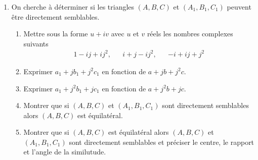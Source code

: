 \begin{enumerate}
\item On cherche à déterminer si les triangles $(A, B, C)$ et $(A_1, B_1, C_1)$ peuvent être directement semblables.
\begin{enumerate}
 \item Mettre sous la forme $u+iv$ avec $u$ et $v$ réels les nombres complexes suivants
\begin{align*}
 1-ij+ij^2, & & i + j -ij^2, & & -i+ij+j^2
\end{align*}
 \item Exprimer $a_1+jb_1+j^2c_1$ en fonction de $a+jb+j^2c$.
 \item Exprimer $a_1+j^2b_1+jc_1$ en fonction de $a+j^2b+jc$.
 \item Montrer que si $(A, B, C)$ et $(A_1, B_1, C_1)$ sont directement semblables alors $(A,B,C)$ est équilatéral.
 \item Montrer que si $(A,B,C)$ est équilatéral alors $(A, B, C)$ et $(A_1, B_1, C_1)$ sont directement semblables et préciser le centre, le rapport et l'angle de la similutude.
\end{enumerate}

\end{enumerate}
